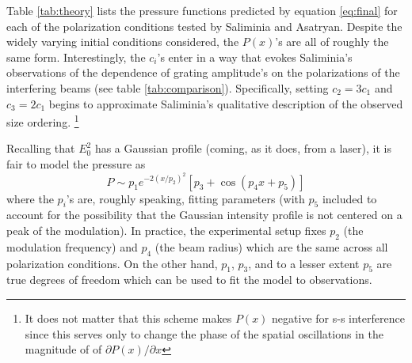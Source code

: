 \documentclass[twocolumn,showpacs,preprintnumbers,amsmath,amssymb]{revtex4}
\begin{document}
Table \ref{tab:theory} lists the pressure functions predicted by equation \ref{eq:final}
for each of the polarization conditions tested by Saliminia and Asatryan. Despite the
widely varying initial conditions considered, the $P(x)$'s are all of roughly the same
form. Interestingly, the $c_i$'s enter in a way that evokes Saliminia's observations of
the dependence of grating amplitude's on the polarizations of the interfering beams (see
table \ref{tab:comparison}). Specifically, setting $c_2 = 3c_1$ and $c_3 = 2c_1$ begins
to approximate Saliminia's qualitative description of the observed
size ordering.
\footnote[1]{It does not matter that this scheme makes $P(x)$ negative for s-s
interference since this serves only to change the phase of the spatial oscillations in
the magnitude of of $\partial P(x)/ \partial x$}

Recalling that $E_0^2$ has a Gaussian profile (coming, as it does, from a laser), it is
fair to model the pressure as
\begin{equation}
P\sim p_1 e^{-2\left(x/p_2\right)^2}\left[p_3+\cos\left( p_4 x +p_5\right)\right]
\label{eq:presmod}
\end{equation}
where the $p_i$'s are, roughly speaking, fitting parameters (with $p_5$ included to
account for the possibility that the Gaussian intensity profile is not centered on a peak
of the modulation). In practice, the experimental setup fixes $p_2$ (the modulation
frequency) and $p_4$ (the beam radius) which are the same across all polarization
conditions. On the other hand, $p_1$, $p_3$, and to a lesser extent $p_5$ are true
degrees of freedom which can be used to fit the model to observations.
\end{document}

